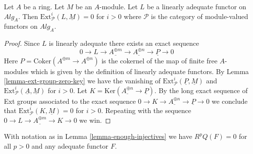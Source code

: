 \begin{lemma}
\label{lemma-ext-group-zero}
Let $A$ be a ring. Let $M$ be an $A$-module. Let $L$ be a linearly
adequate functor on $\textit{Alg}_A$. Then
$\text{Ext}^i_\mathcal{P}(L, \underline{M}) = 0$
for $i > 0$ where $\mathcal{P}$ is the category of module-valued
functors on $\textit{Alg}_A$.
\end{lemma}

\begin{proof}
Since $L$ is linearly adequate there exists an exact sequence
$$
0 \to L \to \underline{A^{\oplus m}} \to \underline{A^{\oplus n}} \to
\underline{P} \to 0
$$
Here $P = \text{Coker}(A^{\oplus m} \to A^{\oplus n})$ is the cokernel
of the map of finite free $A$-modules which is given by the definition
of linearly adequate functors. By
Lemma \ref{lemma-ext-group-zero-key}
we have the vanishing of
$\text{Ext}^i_\mathcal{P}(\underline{P}, \underline{M})$
and
$\text{Ext}^i_\mathcal{P}(\underline{A}, \underline{M})$
for $i > 0$.
Let $K = \text{Ker}(\underline{A^{\oplus n}} \to \underline{P})$.
By the long exact sequence of Ext groups associated to the exact sequence
$0 \to K \to \underline{A^{\oplus n}} \to \underline{P} \to 0$
we conclude that
$\text{Ext}^i_\mathcal{P}(K, \underline{M}) = 0$ for $i > 0$.
Repeating with the sequence
$0 \to L \to \underline{A^{\oplus m}} \to K \to 0$
we win.
\end{proof}

\begin{lemma}
\label{lemma-RQ-zero}
With notation as in
Lemma \ref{lemma-enough-injectives}
we have $R^pQ(F) = 0$ for all $p > 0$ and any adequate functor $F$.
\end{lemma}


